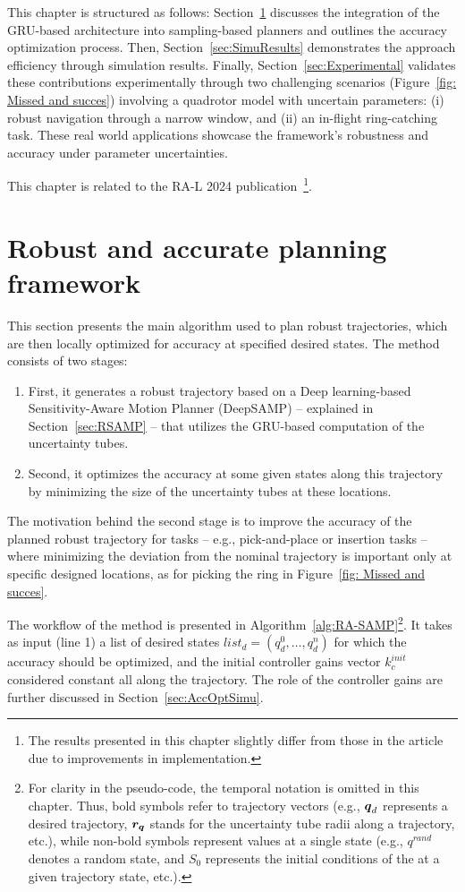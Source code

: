 This chapter is structured as follows: Section~\ref{sec:RASAMP} discusses the integration of the GRU-based architecture into sampling-based planners and outlines the accuracy optimization process.
Then, Section~\ref{sec:SimuResults} demonstrates the approach efficiency through simulation results.
Finally, Section~\ref{sec:Experimental} validates these contributions experimentally through two challenging scenarios (Figure~\ref{fig: Missed and succes}) involving a quadrotor model with uncertain parameters: (i) robust navigation through a narrow window, and (ii) an in-flight ring-catching task. 
These real world applications showcase the framework's robustness and accuracy under parameter uncertainties.

This chapter is related to the RA-L 2024 publication~\cite{cRAL}\footnote{The results presented in this chapter slightly differ from those in the article due to improvements in implementation.}.

\section{Robust and accurate planning framework}\label{sec:RASAMP}

This section presents the main algorithm used to plan robust trajectories, which are then locally optimized for accuracy at specified desired states. 
The method consists of two stages: 
\begin{enumerate}
    \item First, it generates a robust trajectory based on a Deep learning-based Sensitivity-Aware Motion Planner (DeepSAMP) -- explained in Section~\ref{sec:RSAMP} -- that utilizes the GRU-based computation of the uncertainty tubes.
    \item Second, it optimizes the accuracy at some given states along this trajectory by minimizing the size of the uncertainty tubes at these locations.
\end{enumerate}

The motivation behind the second stage is to improve the accuracy of the planned robust trajectory for tasks -- e.g., pick-and-place or insertion tasks -- where minimizing the deviation from the nominal trajectory is important only at specific designed locations, as for picking the ring in Figure~\ref{fig: Missed and succes}.

The workflow of the method is presented in Algorithm~\ref{alg:RA-SAMP}\footnote{For clarity in the pseudo-code, the temporal notation is omitted in this chapter. 
Thus, bold symbols refer to trajectory vectors (e.g., $\boldsymbol{q}_d$ represents a desired trajectory, $\boldsymbol{r_q}$ stands for the uncertainty tube radii along a trajectory, etc.), while non-bold symbols represent values at a single state (e.g., $q^{rand}$ denotes a random state, and $S_0$ represents the initial conditions of the  at a given trajectory state, etc.).}. 
It takes as input (line 1) a list of desired states $list_{d} = (q_{d}^0, \dots, q_{d}^n)$ for which the accuracy should be optimized, and the initial controller gains vector $k_{c}^{init}$ considered constant all along the trajectory.
The role of the controller gains are further discussed in Section~\ref{sec:AccOptSimu}.

